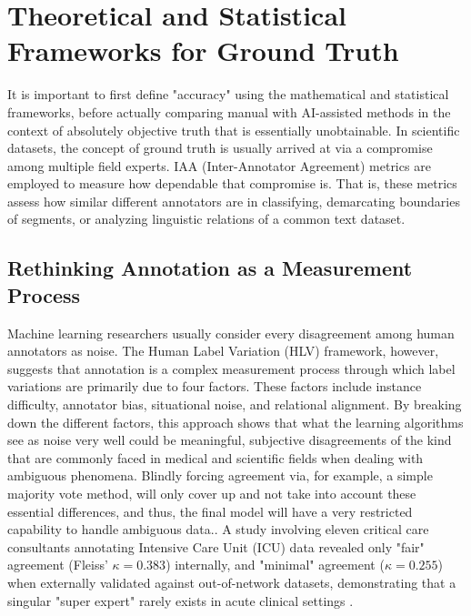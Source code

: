 \documentclass[10pt, conference, letterpaper]{IEEEtran}
\begin{document}
\section{Theoretical and Statistical Frameworks for Ground Truth}
\label{sec:theory}
It is important to first define "accuracy" using the mathematical and statistical frameworks, before actually comparing manual with AI-assisted methods in the context of absolutely objective truth that is essentially unobtainable.
In scientific datasets, the concept of ground truth is usually arrived at via a compromise among multiple field experts. IAA (Inter-Annotator Agreement) metrics are employed to measure how dependable that compromise is.
That is, these metrics assess how similar different annotators are in classifying, demarcating boundaries of segments, or analyzing linguistic relations of a common text dataset.

\subsection{Rethinking Annotation as a Measurement Process}
Machine learning researchers usually consider every disagreement among human annotators as noise. The Human Label Variation (HLV) framework, however, suggests that annotation is a complex measurement process through which label variations are primarily due to four factors. These factors include instance difficulty, annotator bias, situational noise, and relational alignment. By breaking down the different factors, this approach shows that what the learning algorithms see as noise very well could be meaningful, subjective disagreements of the kind that are commonly faced in medical and scientific fields when dealing with ambiguous phenomena. Blindly forcing agreement via, for example, a simple majority vote method, will only cover up and not take into account these essential differences, and thus, the final model will have a very restricted capability to handle ambiguous data.\cite{ref1}. A study involving eleven critical care consultants annotating Intensive Care Unit (ICU) data revealed only "fair" agreement (Fleiss' $\kappa = 0.383$) internally, and "minimal" agreement ($\kappa = 0.255$) when externally validated against out-of-network datasets, demonstrating that a singular "super expert" rarely exists in acute clinical settings \cite{ref2}.
\end{document}
